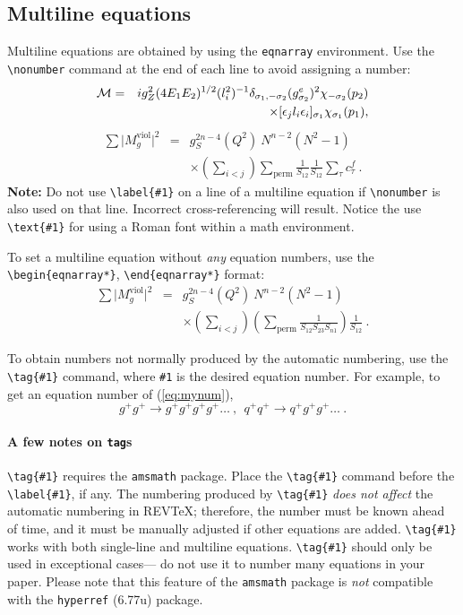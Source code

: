 \documentclass[%
 reprint,
 amsmath,amssymb,
 aps,
]{revtex4-2}
\begin{document}
\subsection{Multiline equations}

Multiline equations are obtained by using the \verb+eqnarray+
environment.  Use the \verb+\nonumber+ command at the end of each line
to avoid assigning a number:
\begin{eqnarray}
{\cal M}=&&ig_Z^2(4E_1E_2)^{1/2}(l_i^2)^{-1}
\delta_{\sigma_1,-\sigma_2}
(g_{\sigma_2}^e)^2\chi_{-\sigma_2}(p_2)\nonumber\\
&&\times
[\epsilon_jl_i\epsilon_i]_{\sigma_1}\chi_{\sigma_1}(p_1),
\end{eqnarray}
\begin{eqnarray}
\sum \vert M^{\text{viol}}_g \vert ^2&=&g^{2n-4}_S(Q^2)~N^{n-2}
        (N^2-1)\nonumber \\
 & &\times \left( \sum_{i<j}\right)
  \sum_{\text{perm}}
 \frac{1}{S_{12}}
 \frac{1}{S_{12}}
 \sum_\tau c^f_\tau~.
\end{eqnarray}
\textbf{Note:} Do not use \verb+\label{#1}+ on a line of a multiline
equation if \verb+\nonumber+ is also used on that line. Incorrect
cross-referencing will result. Notice the use \verb+\text{#1}+ for
using a Roman font within a math environment.

To set a multiline equation without \emph{any} equation
numbers, use the \verb+\begin{eqnarray*}+,
\verb+\end{eqnarray*}+ format:
\begin{eqnarray*}
\sum \vert M^{\text{viol}}_g \vert ^2&=&g^{2n-4}_S(Q^2)~N^{n-2}
        (N^2-1)\\
 & &\times \left( \sum_{i<j}\right)
 \left(
  \sum_{\text{perm}}\frac{1}{S_{12}S_{23}S_{n1}}
 \right)
 \frac{1}{S_{12}}~.
\end{eqnarray*}

To obtain numbers not normally produced by the automatic numbering,
use the \verb+\tag{#1}+ command, where \verb+#1+ is the desired
equation number. For example, to get an equation number of
(\ref{eq:mynum}),
\begin{equation}
g^+g^+ \rightarrow g^+g^+g^+g^+ \dots ~,~~q^+q^+\rightarrow
q^+g^+g^+ \dots ~. \tag{2.6$'$}\label{eq:mynum}
\end{equation}

\paragraph{A few notes on \texttt{tag}s} 
\verb+\tag{#1}+ requires the \texttt{amsmath} package. 
Place the \verb+\tag{#1}+ command before the \verb+\label{#1}+, if any. 
The numbering produced by \verb+\tag{#1}+ \textit{does not affect} 
the automatic numbering in REV\TeX; 
therefore, the number must be known ahead of time, 
and it must be manually adjusted if other equations are added. 
\verb+\tag{#1}+ works with both single-line and multiline equations. 
\verb+\tag{#1}+ should only be used in exceptional cases---%
do not use it to number many equations in your paper. 
Please note that this feature of the \texttt{amsmath} package
is \emph{not} compatible with the \texttt{hyperref} (6.77u) package.
\end{document}
